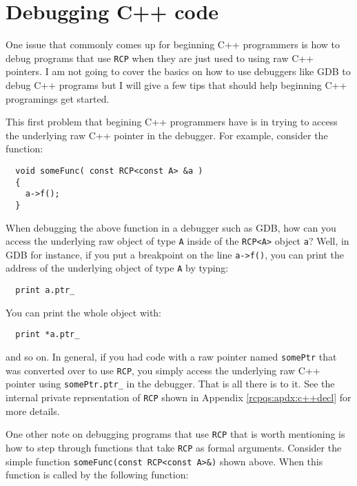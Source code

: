 \documentclass[pdf,ps2pdf,11pt]{SANDreport}
\begin{document}
%
\section{Debugging C++ code}
%

One issue that commonly comes up for beginning C++ programmers is how
to debug programs that use {}\texttt{RCP} when they are just used to
using raw C++ pointers.  I am not going to cover the basics on how to
use debuggers like GDB to debug C++ programs but I will give a few
tips that should help beginning C++ programings get started.

This first problem that begining C++ programmers have is in trying to
access the underlying raw C++ pointer in the debugger.  For example,
consider the function:

{\small\begin{verbatim}
  void someFunc( const RCP<const A> &a )
  {
    a->f();
  }
\end{verbatim}}

When debugging the above function in a debugger such as GDB, how can
you access the underlying raw object of type {}\texttt{A} inside of
the {}\texttt{RCP<A>} object {}\texttt{a}?  Well, in GDB for instance,
if you put a breakpoint on the line {}\texttt{a->f()}, you can print
the address of the underlying object of type {}\texttt{A} by typing:

{\small\begin{verbatim}
  print a.ptr_
\end{verbatim}}

You can print the whole object with:

{\small\begin{verbatim}
  print *a.ptr_
\end{verbatim}}

{}\noindent{}and so on.  In general, if you had code with a raw
pointer named {}\texttt{somePtr} that was converted over to use
{}\texttt{RCP}, you simply access the underlying raw C++ pointer using
{}\texttt{somePtr.ptr\_} in the debugger.  That is all there is to it.
See the internal private reprsentation of {}\texttt{RCP} shown in
Appendix {}\ref{rcpqs:apdx:c++decl} for more details.

One other note on debugging programs that use {}\texttt{RCP} that is
worth mentioning is how to step through functions that take
{}\texttt{RCP} as formal arguments.  Consider the simple function
{}\texttt{someFunc(const RCP<const A>\&)} shown above.  When this function
is called by the following function:
\end{document}
